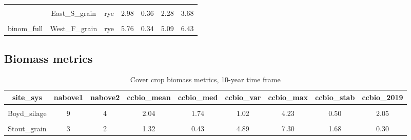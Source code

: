 \documentclass[
]{article}
\begin{document}
\begin{table}[H]
\begin{tabular}[t]{ccccccc}
\cellcolor{gray!6}{binom\_full} & \cellcolor{gray!6}{East\_S\_grain} & \cellcolor{gray!6}{no} & \cellcolor{gray!6}{3.42} & \cellcolor{gray!6}{0.36} & \cellcolor{gray!6}{2.73} & \cellcolor{gray!6}{4.12}\\
 & \multirow{-2}{*}{\centering\arraybackslash East\_S\_grain} & rye & 2.98 & 0.36 & 2.28 & 3.68\\

\cellcolor{gray!6}{binom\_full} & \cellcolor{gray!6}{West\_F\_grain} & \cellcolor{gray!6}{no} & \cellcolor{gray!6}{6.04} & \cellcolor{gray!6}{0.33} & \cellcolor{gray!6}{5.38} & \cellcolor{gray!6}{6.69}\\
\multirow{-10}{*}{\centering\arraybackslash binom\_full} & \multirow{-2}{*}{\centering\arraybackslash West\_F\_grain} & rye & 5.76 & 0.34 & 5.09 & 6.43\\
\bottomrule
\end{tabular}
\end{table}

\hypertarget{biomass-metrics}{%
\subsection{Biomass metrics}\label{biomass-metrics}}

\begin{table}[H]

\caption{\label{tab:ccbio10yr}Cover crop biomass metrics, 10-year time frame}
\centering
\begin{tabular}[t]{ccccccccc}
\toprule
site\_sys & nabove1 & nabove2 & ccbio\_mean & ccbio\_med & ccbio\_var & ccbio\_max & ccbio\_stab & ccbio\_2019\\
\midrule
\cellcolor{gray!6}{Boyd\_grain} & \cellcolor{gray!6}{4} & \cellcolor{gray!6}{2} & \cellcolor{gray!6}{1.03} & \cellcolor{gray!6}{0.74} & \cellcolor{gray!6}{0.77} & \cellcolor{gray!6}{2.76} & \cellcolor{gray!6}{0.85} & \cellcolor{gray!6}{1.29}\\
Boyd\_silage & 9 & 4 & 2.04 & 1.74 & 1.02 & 4.23 & 0.50 & 2.05\\
\cmidrule{1-9}
\cellcolor{gray!6}{Funcke\_grain} & \cellcolor{gray!6}{2} & \cellcolor{gray!6}{1} & \cellcolor{gray!6}{0.45} & \cellcolor{gray!6}{0.14} & \cellcolor{gray!6}{0.46} & \cellcolor{gray!6}{2.11} & \cellcolor{gray!6}{1.50} & \cellcolor{gray!6}{0.00}\\
Stout\_grain & 3 & 2 & 1.32 & 0.43 & 4.89 & 7.30 & 1.68 & 0.30\\
\bottomrule
\end{tabular}
\end{table}
\end{document}
